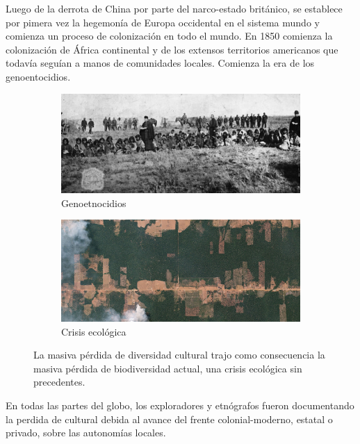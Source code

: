 \documentclass[a4paper,10pt]{book}
\theoremstyle{definition}
\begin{document}

Luego de la derrota de China por parte del narco-estado británico, se establece por pimera vez la hegemonía de Europa occidental en el sistema mundo y comienza un proceso de colonización en todo el mundo.
En 1850 comienza la colonización de África continental y de los extensos territorios americanos que todavía seguían a manos de comunidades locales.
Comienza la era de los genoentocidios.
\begin{figure}[ht!]
    \centering
    \begin{subfigure}[b]{0.48\textwidth}
    \includegraphics[width=\linewidth]{static/genocidio_patagonia}
    \caption{Genoetnocidios}
    \label{fig:genocidio_patagonia}
    \end{subfigure}
    \begin{subfigure}[b]{0.47\textwidth}
    \includegraphics[width=\linewidth]{static/deforestation-brazil}
    \caption{Crisis ecológica}
    \label{fig:deforestation-brazil}
    \end{subfigure}
    \caption{
    La masiva pérdida de diversidad cultural trajo como consecuencia la masiva pérdida de biodiversidad actual, una crisis ecológica sin precedentes.
    }
    \label{fig:cultural-lose}
\end{figure}
En todas las partes del globo, los exploradores y etnógrafos fueron documentando la perdida de cultural debida al avance del frente colonial-moderno, estatal o privado, sobre las autonomías locales.
\end{document}

